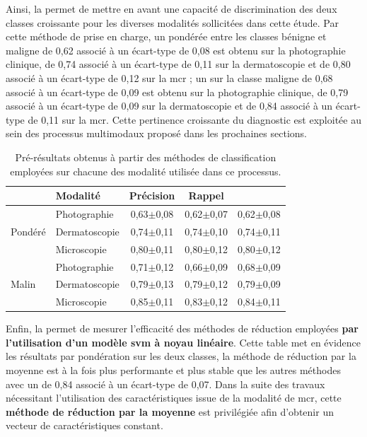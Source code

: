 Ainsi, la  permet de mettre en avant une capacité de discrimination des deux classes croissante pour les diverses modalités sollicitées dans cette étude. Par cette méthode de prise en charge, un \fscore{} pondérée entre les classes bénigne et maligne de 0,62 associé à un écart-type de 0,08 est obtenu sur la photographie clinique, de 0,74 associé à un écart-type de 0,11 sur la dermatoscopie et de 0,80 associé à un écart-type de 0,12 sur la \gls{mcr} ; un \fscore{} sur la classe maligne de 0,68 associé à un écart-type de 0,09 est obtenu sur la photographie clinique, de 0,79 associé à un écart-type de 0,09 sur la dermatoscopie et de 0,84 associé à un écart-type de 0,11 sur la \gls{mcr}. Cette pertinence croissante du diagnostic est exploitée au sein des processus multimodaux proposé dans les prochaines sections.\par

\begin{table}[H]
    \centering
    \begin{tabular}{llccc} \toprule
        \multicolumn{1}{l}{}     & Modalité      & Précision    & Rappel        & \Fscore{}     \\ \midrule
        \multirow{3}{*}{Pondéré} & Photographie  & 0,63$\pm$0,08& 0,62$\pm$0,07 & 0,62$\pm$0,08 \\
                                 & Dermatoscopie & 0,74$\pm$0,11& 0,74$\pm$0,10 & 0,74$\pm$0,11 \\
                                 & Microscopie   & 0,80$\pm$0,11& 0,80$\pm$0,12 & 0,80$\pm$0,12 \\ \midrule
        \multirow{3}{*}{Malin}   & Photographie  & 0,71$\pm$0,12& 0,66$\pm$0,09 & 0,68$\pm$0,09 \\
                                 & Dermatoscopie & 0,79$\pm$0,13& 0,79$\pm$0,12 & 0,79$\pm$0,09 \\
                                 & Microscopie   & 0,85$\pm$0,11& 0,83$\pm$0,12 & 0,84$\pm$0,11 \\ \bottomrule
    \end{tabular}
    \caption{Pré-résultats obtenus à partir des méthodes de classification employées sur chacune des modalité utilisée dans ce processus.}
    \label{tab:results_multimodality_modalities}
\end{table}

Enfin, la  permet de mesurer l'efficacité des méthodes de réduction employées \textbf{par l'utilisation d'un modèle \gls{svm} à noyau linéaire}. Cette table met en évidence les résultats par pondération sur les deux classes, la méthode de réduction par la moyenne est à la fois plus performante et plus stable que les autres méthodes avec un \fscore{} de 0,84 associé à un écart-type de 0,07. Dans la suite des travaux nécessitant l'utilisation des caractéristiques issue de la modalité de \gls{mcr}, cette \textbf{méthode de réduction par la moyenne} est privilégiée afin d'obtenir un vecteur de caractéristiques constant.\par

